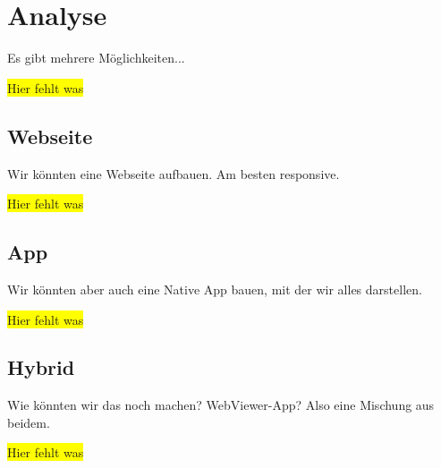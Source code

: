 \section{Analyse}
Es gibt mehrere Möglichkeiten...

\colorbox{yellow}{Hier fehlt was}

\subsection{Webseite}
Wir könnten eine Webseite aufbauen. Am besten responsive.

\colorbox{yellow}{Hier fehlt was}

\subsection{App}
Wir könnten aber auch eine Native App bauen, mit der wir alles darstellen.

\colorbox{yellow}{Hier fehlt was}

\subsection{Hybrid}
Wie könnten wir das noch machen? WebViewer-App? Also eine Mischung aus beidem.

\colorbox{yellow}{Hier fehlt was}
